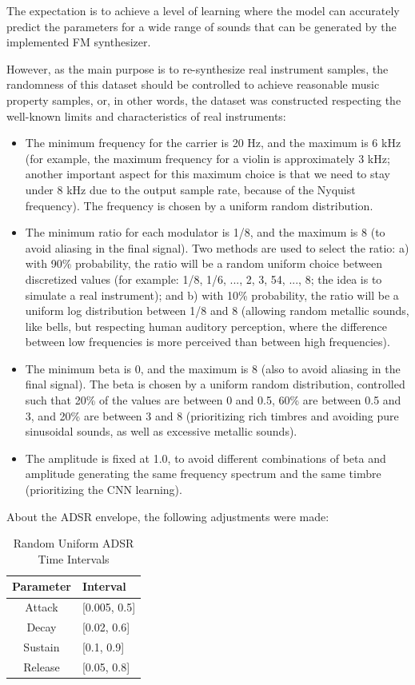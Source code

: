 \documentclass[10pt,conference]{IEEEtran}
\begin{document}
The expectation is to achieve a level of learning where the model can accurately predict the parameters for a wide range of sounds that can be generated by the implemented FM synthesizer.

However, as the main purpose is to re-synthesize real instrument samples, the randomness of this dataset should be controlled to achieve reasonable music property samples, or, in other words, the dataset was constructed respecting the well-known limits and characteristics of real instruments:

\begin{itemize}
    \item The minimum frequency for the carrier is 20 Hz, and the maximum is 6 kHz (for example, the maximum frequency for a violin is approximately 3 kHz; another important aspect for this maximum choice is that we need to stay under 8 kHz due to the output sample rate, because of the Nyquist frequency). The frequency is chosen by a uniform random distribution.
    \item The minimum ratio for each modulator is 1/8, and the maximum is 8 (to avoid aliasing in the final signal). Two methods are used to select the ratio: a) with 90\% probability, the ratio will be a random uniform choice between discretized values (for example: 1/8, 1/6, ..., 2, 3, 54, ..., 8; the idea is to simulate a real instrument); and b) with 10\% probability, the ratio will be a uniform log distribution between 1/8 and 8 (allowing random metallic sounds, like bells, but respecting human auditory perception, where the difference between low frequencies is more perceived than between high frequencies).
    \item The minimum beta is 0, and the maximum is 8 (also to avoid aliasing in the final signal). The beta is chosen by a uniform random distribution, controlled such that 20\% of the values are between 0 and 0.5, 60\% are between 0.5 and 3, and 20\% are between 3 and 8 (prioritizing rich timbres and avoiding pure sinusoidal sounds, as well as excessive metallic sounds).
    \item The amplitude is fixed at 1.0, to avoid different combinations of beta and amplitude generating the same frequency spectrum and the same timbre (prioritizing the CNN learning).
\end{itemize}

About the ADSR envelope, the following adjustments were made:

\begin{table} \centering
  \caption{Random Uniform ADSR Time Intervals}
  \label{tab:time_intervals}
  \begin{tabular}{cl}
    \toprule
    Parameter & Interval \\
    \midrule
    Attack  & [0.005, 0.5] \\
    Decay   & [0.02, 0.6] \\
    Sustain & [0.1, 0.9] \\
    Release & [0.05, 0.8] \\
    \bottomrule
  \end{tabular}
\end{table}
\end{document}
